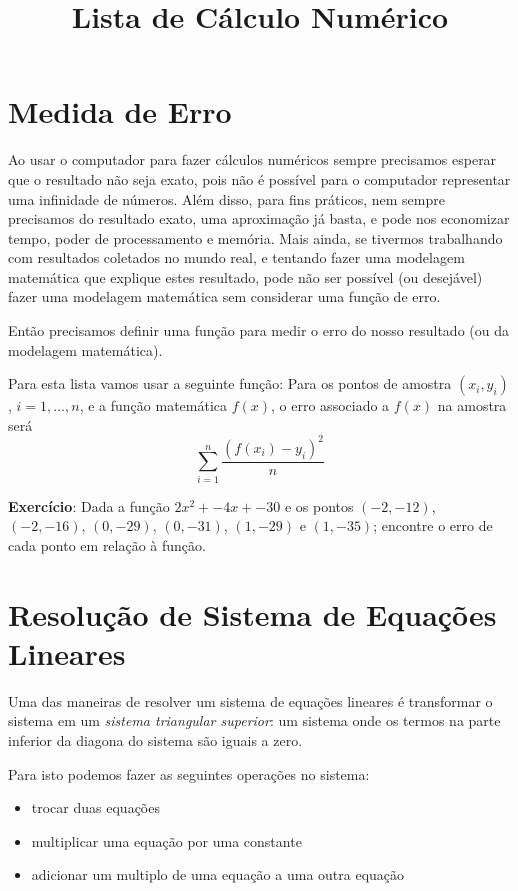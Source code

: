 \documentclass[12pt]{article}
\title{Lista de Cálculo Numérico}
\date{}
\begin{document}
\maketitle


\vspace{3em}

\section{Medida de Erro}

Ao usar o computador para fazer cálculos numéricos
sempre precisamos esperar que o resultado não seja exato, 
pois não é possível para o computador representar uma infinidade de números. Além disso, para fins práticos, nem sempre precisamos do resultado exato, uma aproximação já basta, e pode nos economizar tempo, poder de processamento e memória. Mais ainda, se tivermos trabalhando com resultados coletados no mundo real, e tentando fazer uma modelagem matemática que explique estes resultado, pode não ser possível (ou desejável) fazer uma modelagem matemática sem considerar uma função de erro.

Então precisamos definir uma função para medir o erro do nosso resultado (ou da modelagem matemática).

Para esta lista vamos usar a seguinte função: 
Para os pontos de amostra $(x_i, y_i)$, $i = 1, ..., n$, e a função matemática $f(x)$, o erro associado a $f(x)$ na amostra será
\[\sum_{i=1}^{n}\frac{(f(x_i) - y_i)^2}{n}\]

\textbf{Exercício}: Dada a função $2x^2 + -4x + -30$ e os pontos $(-2, -12)$, $(-2, -16)$, $(0, -29)$, $(0, -31)$, $(1, -29)$ e $(1, -35)$; encontre o erro de cada ponto em relação à função.



\break





\section{Resolução de Sistema de Equações Lineares}

Uma das maneiras de resolver um sistema de equações lineares é transformar o sistema em um \textit{sistema triangular superior}: um sistema onde os termos na parte inferior da diagona do sistema são iguais a zero.

Para isto podemos fazer as seguintes operações no sistema:
\begin{itemize}
\item trocar duas equações
\item multiplicar uma equação por uma constante
\item adicionar um multiplo de uma equação a uma outra equação
\end{itemize}
\end{document}
